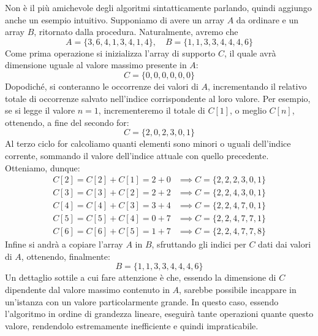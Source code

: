 \noindent Non è il più amichevole degli algoritmi sintatticamente parlando, quindi aggiungo anche un esempio intuitivo. Supponiamo di avere un array $A$ da ordinare e un array $B$, ritornato dalla procedura. Naturalmente, avremo che \[A = \{3, 6, 4, 1, 3, 4, 1, 4\},\quad B = \{1, 1, 3, 3, 4, 4, 4, 6\}\]
\noindent Come prima operazione si inizializza l'array di supporto $C$, il quale avrà dimensione uguale al valore massimo presente in $A$: \[C = \{0, 0, 0, 0, 0, 0\}\]
\noindent Dopodiché, si conteranno le occorrenze dei valori di $A$, incrementando il relativo totale di occorrenze salvato nell'indice corrispondente al loro valore. Per esempio, se si legge il valore $n=1$, incrementeremo il totale di $C[1]$, o meglio $C[n]$, ottenendo, a fine del secondo for: \[C = \{2, 0, 2, 3, 0, 1\}\]
\noindent Al terzo ciclo for calcoliamo quanti elementi sono minori o uguali dell'indice corrente, sommando il valore dell'indice attuale con quello precedente. Otteniamo, dunque: \begin{equation}
	\begin{split}
		C[2] = C[2]+C[1] = 2+0 &\implies C = \{2, 2, 2, 3, 0, 1\}\\
		C[3] = C[3]+C[2] = 2+2 &\implies C = \{2, 2, 4, 3, 0, 1\}\\
		C[4] = C[4]+C[3] = 3+4 &\implies C = \{2, 2, 4, 7, 0, 1\}\\
		C[5] = C[5]+C[4] = 0+7 &\implies C = \{2, 2, 4, 7, 7, 1\}\\
		C[6] = C[6]+C[5] = 1+7 &\implies C = \{2, 2, 4, 7, 7, 8\}
	\end{split}
\end{equation}
\noindent Infine si andrà a copiare l'array $A$ in $B$, sfruttando gli indici per $C$ dati dai valori di $A$, ottenendo, finalmente: \[B = \{1, 1, 3, 3, 4, 4, 4, 6\}\]
\noindent Un dettaglio sottile a cui fare attenzione è che, essendo la dimensione di $C$ dipendente dal valore massimo contenuto in $A$, sarebbe possibile incappare in un'istanza con un valore particolarmente grande. In questo caso, essendo l'algoritmo in ordine di grandezza lineare, eseguirà tante operazioni quante questo valore, rendendolo estremamente inefficiente e quindi impraticabile.

%

